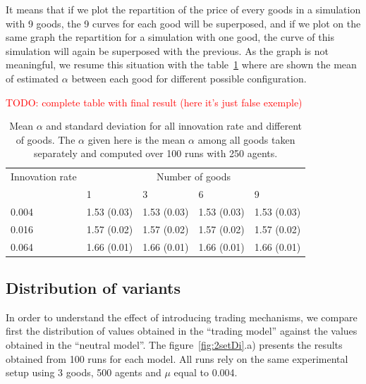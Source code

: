 \documentclass{wscpaperproc}
\newcommand{\memo}[2]{\textcolor{#1}{#2}}
\newcommand{\todo}[1]{\memo{red}{TODO: #1\\}}
\begin{document}
It means that if we plot the repartition of the price of every goods in a simulation with 9 goods, the 9 curves for each good will be superposed, and if we plot on the same graph the repartition for a simulation with one good, the curve of this simulation will again be superposed with the previous. As the graph is not meaningful, we resume this situation with the table~\ref{tab:multiGoods} where are shown the mean of estimated $\alpha$ between each good for different possible configuration.


\todo{complete table with final result (here it's just false exemple)}
\begin{table}[h]
	\centering
	\begin{tabular}{l|llll}
		Innovation rate &\multicolumn{4}{c}{Number of goods}\\
		      & 1   & 3   &  6 & 9  \\\hline
		0.004 &1.53 (0.03)  &1.53 (0.03)&1.53 (0.03)&1.53 (0.03) \\
		0.016 &1.57 (0.02)  &1.57 (0.02)&1.57 (0.02)&1.57 (0.02) \\
		0.064 &1.66 (0.01)  &1.66 (0.01)&1.66 (0.01)&1.66 (0.01) \\\hline
	\end{tabular}
	\caption{Mean $\alpha$ and standard deviation for all innovation rate and different  of goods. The $\alpha$ given here is the mean $\alpha$ among all goods taken separately and computed over 100 runs with 250 agents.}
	\label{tab:multiGoods}
\end{table}

\subsection{Distribution of variants}

In order to understand the effect of introducing trading mechanisms, we compare first the distribution of values obtained in the ``trading model'' against the values obtained in the ``neutral model''. The figure~\ref{fig:2setDi}.a) presents the results obtained from 100 runs for each model. All runs rely on the same experimental setup using 3 goods, 500 agents and $\mu$ equal to 0.004. 
\end{document}
